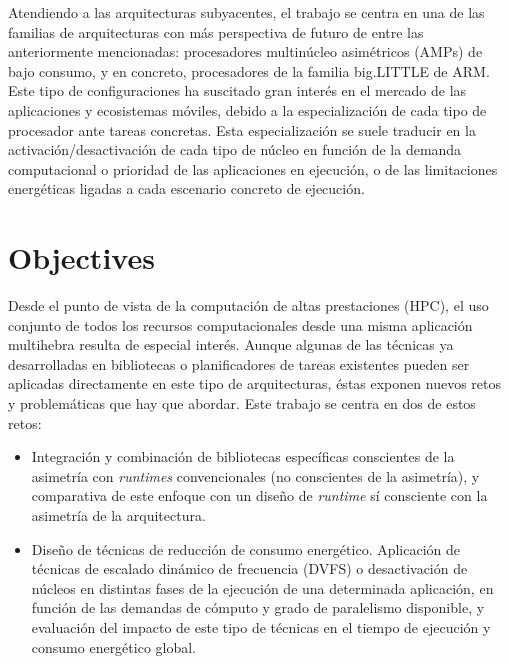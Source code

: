 Atendiendo a las arquitecturas subyacentes, el trabajo se centra en una de
las familias de arquitecturas con más perspectiva de futuro de entre las
anteriormente mencionadas: procesadores multinúcleo asimétricos (AMPs) de
bajo consumo, y en concreto, procesadores de la familia big.LITTLE de ARM.
Este tipo de configuraciones ha suscitado gran interés en el mercado de las
aplicaciones y ecosistemas móviles, debido a la especialización de cada
tipo de procesador ante tareas concretas. Esta especialización se suele
traducir en la activación/desactivación de cada tipo de núcleo en función
de la demanda computacional o prioridad de las aplicaciones en ejecución, o
de las limitaciones energéticas ligadas a cada escenario concreto de
ejecución.


\section{Objectives}
Desde el punto de vista de la computación de altas prestaciones (HPC), el
uso conjunto de todos los recursos computacionales desde una misma
aplicación multihebra resulta de especial interés. Aunque algunas de las
técnicas ya desarrolladas en bibliotecas o planificadores de tareas
existentes pueden ser aplicadas directamente en este tipo de arquitecturas,
éstas exponen nuevos retos y problemáticas que hay que abordar. Este
trabajo se centra en dos de estos retos:
\begin{itemize}
\item Integración y combinación de bibliotecas específicas conscientes de
  la asimetría con \emph{runtimes} convencionales (no conscientes de la
  asimetría), y comparativa de este enfoque con un diseño de \emph{runtime}
  sí consciente con la asimetría de la arquitectura.

\item Diseño de técnicas de reducción de consumo energético. Aplicación de
  técnicas de escalado dinámico de frecuencia (DVFS) o desactivación de
  núcleos en distintas fases de la ejecución de una determinada aplicación,
  en función de las demandas de cómputo y grado de paralelismo disponible, y
  evaluación del impacto de este tipo de técnicas en el tiempo de ejecución
  y consumo energético global.
\end{itemize}


